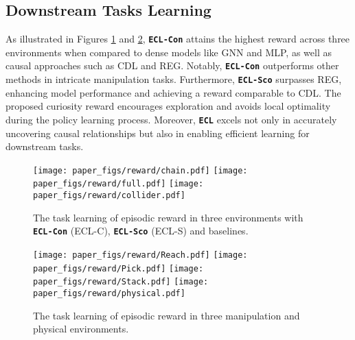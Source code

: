 \clearpage
\subsection{Downstream Tasks Learning}
\label{Downstream tasks learning}

As illustrated in Figures \ref{fig:abl_reward} and \ref{fig:abl_rew_other}, \texttt{\textbf{ECL-Con}} attains the highest reward across three environments when compared to dense models like GNN and MLP, as well as causal approaches such as CDL and REG. Notably, \texttt{\textbf{ECL-Con}} outperforms other methods in intricate manipulation tasks.
Furthermore, \texttt{\textbf{ECL-Sco}} surpasses REG, enhancing model performance and achieving a reward comparable to CDL.
The proposed curiosity reward encourages exploration and avoids local optimality during the policy learning process. 
Moreover, \texttt{\textbf{ECL}} excels not only in accurately uncovering causal relationships but also in enabling efficient learning for downstream tasks.

\begin{figure}[t]
\centering
\texttt{[image: paper\_figs/reward/chain.pdf]}
\texttt{[image: paper\_figs/reward/full.pdf]}
\texttt{[image: paper\_figs/reward/collider.pdf]}
\caption{The task learning of episodic reward in three environments with \texttt{\textbf{ECL-Con}} (ECL-C), \texttt{\textbf{ECL-Sco}} (ECL-S) and baselines.} 
\label{fig:abl_reward}
\end{figure}

\begin{figure}[t]
\centering
\texttt{[image: paper\_figs/reward/Reach.pdf]}
\texttt{[image: paper\_figs/reward/Pick.pdf]}
\texttt{[image: paper\_figs/reward/Stack.pdf]}
\texttt{[image: paper\_figs/reward/physical.pdf]}
\caption{The task learning of episodic reward in three manipulation and physical environments.}
\label{fig:abl_rew_other}
\end{figure}

